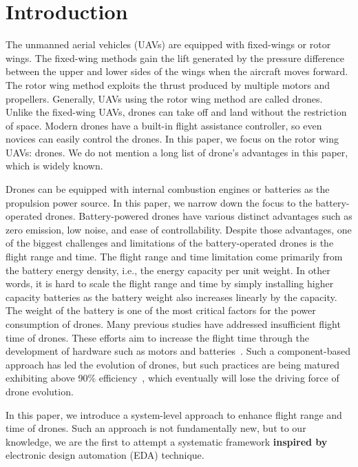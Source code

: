 \documentclass[journal]{./template/IEEEtran}
\begin{document}
\section{Introduction}
\label{Section: introduction}
The unmanned aerial vehicles (UAVs) are equipped with fixed-wings or rotor wings. 
The fixed-wing methods gain the lift generated by the pressure difference between the upper and lower sides of the wings when the aircraft moves forward. 
The rotor wing method exploits the thrust produced by multiple motors and propellers. Generally, UAVs using the rotor wing method are called drones. 
Unlike the fixed-wing UAVs, drones can take off and land without the restriction of space. 
Modern drones have a built-in flight assistance controller, so even novices can easily control the drones. 
In this paper, we focus on the rotor wing UAVs: drones. We do not mention a long list of drone's advantages in this paper, which is widely known. 

Drones can be equipped with internal combustion engines or batteries as the propulsion power source. In this paper, we narrow down the focus to the battery-operated drones.
Battery-powered drones have various distinct advantages such as zero emission, low noise, and ease of controllability.
Despite those advantages, one of the biggest challenges and limitations of the battery-operated drones is the flight range and time. 
The flight range and time limitation come primarily from the battery energy density, i.e., the energy capacity per unit weight.
In other words, it is hard to scale the flight range and time by simply installing higher capacity batteries as the battery weight also increases linearly by the capacity. 
The weight of the battery is one of the most critical factors for the power consumption of drones. 
Many previous studies have addressed insufficient flight time of drones. 
These efforts aim to increase the flight time through the development of hardware such as motors and batteries~\cite{ref_1}.
Such a component-based approach has led the evolution of drones, but such practices are being matured exhibiting above 90\% efficiency~\cite{ref_2}, which eventually will lose the driving force of drone evolution. 

In this paper, we introduce a system-level approach to enhance flight range and time of drones.
Such an approach is not fundamentally new, but to our knowledge, we are the first to attempt a systematic framework \textbf{inspired by} electronic design automation (EDA) technique.

\end{document}
